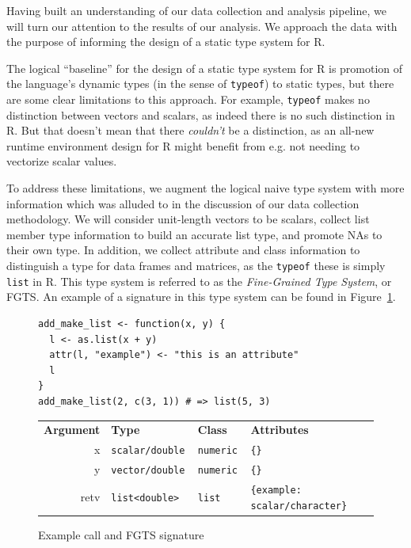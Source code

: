 \documentclass[acmsmall,10pt,review,anonymous]{acmart}\settopmatter{printfolios=true,printccs=false,printacmref=false}
\newcommand{\code}[1]{\lstinline|#1|\xspace}
\begin{document}

Having built an understanding of our data collection and analysis
pipeline, we will turn our attention to the results of our analysis.  We
approach the data with the purpose of informing the design of a static type
system for R. 

The logical ``baseline'' for the design of a static type system for R is
promotion of the language's dynamic types (in the sense of \code{typeof}) to
static types, but there are some clear limitations to this approach.  For
example, \code{typeof} makes no distinction between vectors and scalars, as
indeed there is no such distinction in R.  But that doesn't mean that there
{\it couldn't} be a distinction, as an all-new runtime environment design
for R might benefit from e.g. not needing to vectorize scalar values.

To address these limitations, we augment the logical naive type system with
more information which was alluded to in the discussion of our data
collection methodology.  We will consider unit-length vectors to be scalars,
collect list member type information to build an accurate list type, and
promote NAs to their own type.  In addition, we collect attribute and class
information to distinguish a type for data frames and matrices, as the
\code{typeof} these is simply {\tt list} in R.  This type system is referred
to as the {\it Fine-Grained Type System}, or FGTS.  An example of a signature in
this type system can be found in Figure~\ref{fig:exFGTS}.

\begin{figure}[!hb]{\small\begin{lstlisting}[style=R]
add_make_list <- function(x, y) {
  l <- as.list(x + y)
  attr(l, "example") <- "this is an attribute"
  l
}
add_make_list(2, c(3, 1)) # => list(5, 3)
\end{lstlisting}}
\begin{tabular}{@{}r|l|l|l@{}}\hline
\bf Argument & \bf Type & \bf Class &\bf Attributes \\
x & \tt scalar/double & \tt numeric & \tt \{\} \\
y & \tt vector/double & \tt numeric & \tt \{\} \\
retv & \tt list<double> & \tt list & \tt \{example: scalar/character\}  
\end{tabular}
\caption{Example call and FGTS signature}\label{fig:exFGTS}\end{figure}
\end{document}
